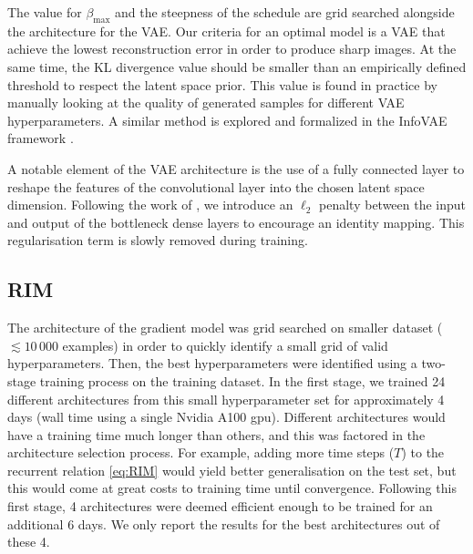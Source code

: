 The value for $\beta_\mathrm{max}$ and the steepness of the schedule 
are grid searched alongside the architecture for the VAE. Our criteria 
for an optimal model is a VAE that achieve the lowest reconstruction error 
in order to produce sharp images. At the same time, the 
KL divergence value should be smaller than an empirically defined threshold to respect 
the latent space prior. 
This value is found in practice by 
manually looking at the quality of generated samples for different VAE 
hyperparameters. A similar method is explored and formalized in the 
InfoVAE framework \citep{Zhao2017}.


A notable element of the VAE architecture is the use of a fully connected  
layer to reshape the features of the convolutional layer into the chosen 
latent space dimension. Following the work of \citet{Lanusse2021}, we introduce 
an $\ell_{2}$ penalty between the input and output of the bottleneck 
dense layers to encourage an identity mapping. This regularisation 
term is slowly removed during training.

\subsection{RIM}\label{sec:rimtraining}

The architecture of the gradient model was grid searched on 
smaller dataset ($\lesssim 10\,000$ examples) 
in order to quickly identify a small grid 
of valid hyperparameters. Then, the best hyperparameters were 
identified using a two-stage training process on the training dataset. 
In the first stage, we trained 24 different architectures from this small 
hyperparameter set for approximately 4 days (wall time using a single Nvidia A100 gpu). 
Different architectures would have a training time much longer than others, and this 
was factored in the architecture selection process. For example, adding more time 
steps ($T$) to the recurrent relation \eqref{eq:RIM} 
would yield better generalisation on the test set, but this 
would come at great costs to training time until convergence. 
Following this first stage, 4 architectures were deemed efficient enough 
to be trained for an additional 6 days. 
We only report the results for the best architectures out of these 4.

